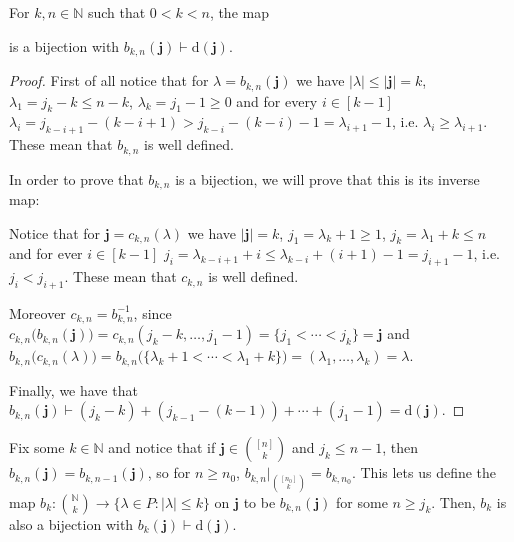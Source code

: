 \begin{proposition}\label{prop:poset_bijection} For $k,n\in\mathbb{N}$ such that $0<k<n$, the map
\begin{center}
\end{center}
is a bijection with $b_{k,n}(\mathbf{j})\vdash\mathrm{d}(\mathbf{j})$.
\end{proposition}
\begin{proof} First of all notice that for $\lambda=b_{k,n}(\mathbf{j})$ we have $|\lambda|\leq|\mathbf{j}|=k$, $\lambda_1=j_k-k\leq n-k$, $\lambda_k=j_1-1\geq 0$ and for every $i\in[k-1]$ $\lambda_i=j_{k-i+1}-(k-i+1)>j_{k-i}-(k-i)-1=\lambda_{i+1}-1$, i.e. $\lambda_i\geq\lambda_{i+1}$. These mean that $b_{k,n}$ is well defined.

In order to prove that $b_{k,n}$ is a bijection, we will prove that this is its inverse map:
\begin{center}
\end{center}
Notice that for $\mathbf{j}=c_{k,n}(\lambda)$ we have $|\mathbf{j}|=k$, $j_1=\lambda_k+1\geq1$, $j_k=\lambda_1+k\leq n$ and for ever $i\in[k-1]$ $j_i=\lambda_{k-i+1}+i\leq\lambda_{k-i}+(i+1)-1=j_{i+1}-1$, i.e. $j_i<j_{i+1}$. These mean that $c_{k,n}$ is well defined.

Moreover $c_{k,n}=b_{k,n}^{-1}$, since $c_{k,n}\big(b_{k,n}(\mathbf{j})\big)=c_{k,n}(j_k-k,\ldots,j_1-1)=\{j_1<\cdots<j_k\}=\mathbf{j}$ and $b_{k,n}\big(c_{k,n}(\lambda)\big)=b_{k,n}\big(\{\lambda_k+1<\cdots<\lambda_1+k\}\big)=(\lambda_1,\ldots,\lambda_k)=\lambda$.

Finally, we have that $b_{k,n}(\mathbf{j})\vdash (j_k-k)+(j_{k-1}-(k-1))+\cdots+(j_1-1)=\mathrm{d}(\mathbf{j})$.
\end{proof}
\begin{remark} Fix some $k\in\mathbb{N}$ and notice that if $\mathbf{j}\in\binom{[n]}{k}$ and $j_k\leq n-1$, then $b_{k,n}(\mathbf{j})=b_{k,n-1}(\mathbf{j})$, so for $n\geq n_0$, $b_{k,n}|_{\binom{[n_0]}{k}}=b_{k,n_0}$. This lets us define the map $b_k:\binom{\mathbb{N}}{k}\to\big\{\lambda\in P:|\lambda|\leq k\}$ on $\mathbf{j}$ to be $b_{k,n}(\mathbf{j})$ for some $n\geq j_k$. Then, $b_k$ is also a bijection with $b_k(\mathbf{j})\vdash\mathrm{d}(\mathbf{j})$.
\end{remark}

